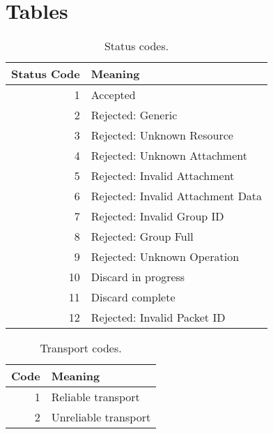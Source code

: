 \documentclass{article}
\begin{document}
\FloatBarrier{}
\clearpage

\appendix
\section{Tables}

\FloatBarrier{}

\begin{table}[h]
    \centering
    \begin{tabular}{r|l}
        Status Code & Meaning \\
        \hline
        1 & Accepted \\
        2 & Rejected: Generic \\
        3 & Rejected: Unknown Resource \\
        4 & Rejected: Unknown Attachment \\
        5 & Rejected: Invalid Attachment \\
        6 & Rejected: Invalid Attachment Data \\
        7 & Rejected: Invalid Group ID \\
        8 & Rejected: Group Full \\
        9 & Rejected: Unknown Operation \\
        10 & Discard in progress \\
        11 & Discard complete \\
        12 & Rejected: Invalid Packet ID
    \end{tabular}
    \caption{Status codes.}
    \label{tab:status-codes}
\end{table}

\begin{table}[h]
    \centering
    \begin{tabular}{r|l}
        Code & Meaning \\
        \hline
        1 & Reliable transport \\
        2 & Unreliable transport
    \end{tabular}
    \caption{Transport codes.}
    \label{tab:transport-codes}
\end{table}

\FloatBarrier{}
\clearpage

\printnoidxglossaries{}
\end{document}
